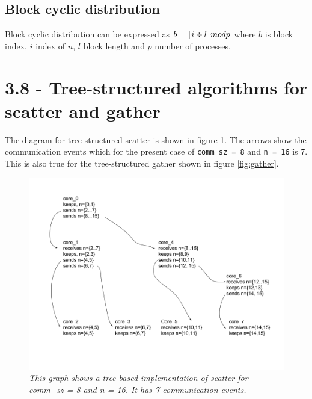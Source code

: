 \documentclass[a4paper,11pt,twoside]{article}
\DeclarePairedDelimiter{\floor}{\lfloor}{\rfloor}
\begin{document}
\subsection*{Block cyclic distribution}
Block cyclic distribution can be expressed as $b = \floor*{i \div l} mod p$ where $b$ is block index, $i$ index of $n$, $l$ block length and $p$ number of processes.

\section{3.8 - Tree-structured algorithms for scatter and gather}
The diagram for tree-structured scatter is shown in figure \ref{fig:scatter}. The arrows show the communication events which for the present case of \verb+comm_sz = 8+ and \verb+n = 16+ is 7. This is also true for the tree-structured gather shown in figure \ref{fig:gather}.
\begin{figure}
  \centering
  \includegraphics[width=1\textwidth]{scatter.png}
  \caption{\textit{This graph shows a tree based implementation of scatter for comm\_sz = 8 and n = 16. It has 7 communication events.}}
  \label{fig:scatter}
\end{figure}
\end{document}
